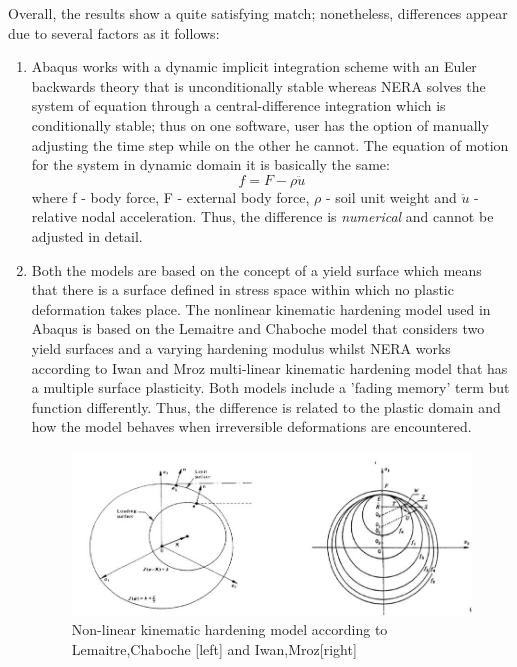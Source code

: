 	Overall, the results show a quite satisfying match; nonetheless, differences appear due to several factors as it follows:
	\begin{enumerate}
		\item Abaqus works with a dynamic implicit integration scheme with an Euler backwards theory that is unconditionally stable whereas NERA solves the system of equation through a central-difference integration which is conditionally stable; thus on one software, user has the option of manually adjusting the time step while on the other he cannot. The equation of motion for the system in dynamic domain it is basically the same:
		\begin{equation}
		f=F-\rho\ddot{u}
		\end{equation}
		where f - body force, F - external body force, $\rho$ - soil unit weight and $\ddot{u}$ - relative nodal acceleration. Thus, the difference is \textit{numerical} and cannot be adjusted in detail.
		\item Both the models are based on the concept of a yield surface which means that there is a surface defined in stress space within which no plastic deformation takes place. The nonlinear kinematic hardening model used in Abaqus is based on the Lemaitre and Chaboche \cite{lemaitre1994mechanics} model that considers two yield surfaces and a varying hardening modulus whilst NERA works according to Iwan and Mroz \cite{mroz1967description} multi-linear kinematic hardening model that has a multiple surface plasticity. Both models include a 'fading memory' term but function differently. Thus, the difference is related to the plastic domain and how the model behaves when irreversible deformations are encountered. 
		\begin{figure}
			\centering
			\includegraphics[width=0.7\linewidth]{"yield_srf"}
			\caption{Non-linear kinematic hardening model according to Lemaitre,Chaboche [left] and Iwan,Mroz[right]}
			\label{Yield}
		\end{figure}

\end{enumerate}
